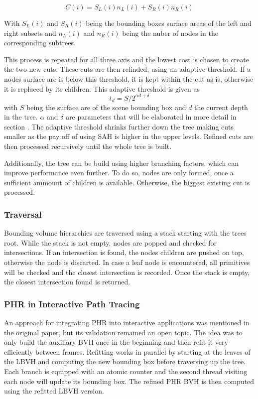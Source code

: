\[C(i)=S_L(i)n_L(i)+S_R(i)n_R(i)\]

With $S_L(i)$ and $S_R(i)$ being the bounding boxes surface areas of the left and right subsets and $n_L(i)$ and $n_R(i)$ being the nuber of nodes in the corresponding subtrees.

This process is repeated for all three axis and the lowest cost is chosen to create the two new cuts. These cuts are then refinded, using an adaptive threshold. If a nodes surface are is below this threshold, it is kept within the cut as is, otherwise it is replaced by its children. 
This adaptive threshold is given as 
\[t_d = S /{2^{\alpha d + \delta}}\]
with $S$ being the surface are of the scene bounding box and $d$ the current depth in the tree. $\alpha$ and $\delta$ are parameters that will be elaborated in more detail in section .
The adaptive threshold shrinks further down the tree making cuts smaller as the pay off of using SAH is higher in the upper levels. Refined cuts are then processed recursively until the whole tree is built. 

Additionally, the tree can be build using higher branching factors, which can improve performance even further. To do so, nodes are only formed, once a sufficient ammount of children is available. Otherwise, the biggest existing cut is processed. 

\subsubsection{Traversal}
\label{traversal}
Bounding volume hierarchies are traversed using a stack starting with the trees root. While the stack is not empty, nodes are popped and checked for intersections. If an intersection is found, the nodes children are pushed on top, otherwise the node is discarted. In case a leaf node is encountered, all primitives will be checked and the closest intersection is recorded. Once the stack is empty, the closest intersection found is returned. 

\subsubsection{PHR in Interactive Path Tracing}
An approach for integrating PHR into interactive applications was mentioned in the original paper\cite{hendrich_parallel_2017}, but its validation remained an open topic. The idea was to only build the auxiliary BVH once in the beginning and then refit it very efficiently between frames. Refitting works in parallel by starting at the leaves of the LBVH and computing the new bounding box before traversing up the tree. Each branch is equipped with an atomic counter and the second thread visiting each node will update its bounding box. The refined PHR BVH is then computed using the refitted LBVH version. 

